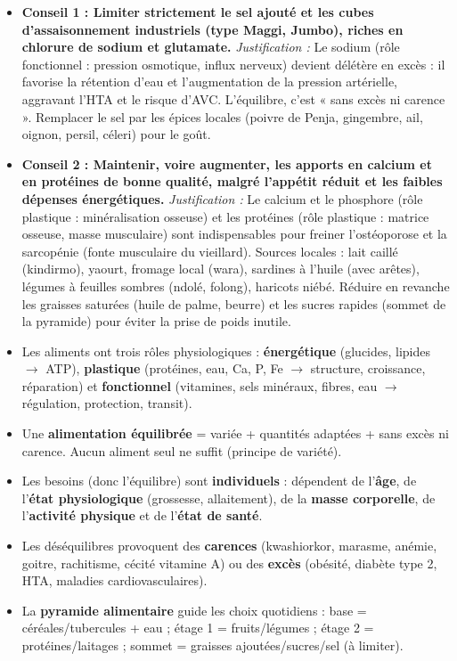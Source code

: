 \documentclass[11pt]{article}
\begin{document}
\begin{corrige}
\begin{itemize}
  \item \textbf{Conseil 1 : Limiter strictement le sel ajouté et les cubes d'assaisonnement industriels (type Maggi, Jumbo), riches en chlorure de sodium et glutamate.}
  \textit{Justification :} Le sodium (rôle fonctionnel : pression osmotique, influx nerveux) devient délétère en excès : il favorise la rétention d'eau et l'augmentation de la pression artérielle, aggravant l'HTA et le risque d'AVC. L'équilibre, c'est « sans excès ni carence ». Remplacer le sel par les épices locales (poivre de Penja, gingembre, ail, oignon, persil, céleri) pour le goût.
  \item \textbf{Conseil 2 : Maintenir, voire augmenter, les apports en calcium et en protéines de bonne qualité, malgré l'appétit réduit et les faibles dépenses énergétiques.}
  \textit{Justification :} Le calcium et le phosphore (rôle plastique : minéralisation osseuse) et les protéines (rôle plastique : matrice osseuse, masse musculaire) sont indispensables pour freiner l'ostéoporose et la sarcopénie (fonte musculaire du vieillard). Sources locales : lait caillé (kindirmo), yaourt, fromage local (wara), sardines à l'huile (avec arêtes), légumes à feuilles sombres (ndolé, folong), haricots niébé. Réduire en revanche les graisses saturées (huile de palme, beurre) et les sucres rapides (sommet de la pyramide) pour éviter la prise de poids inutile.
\end{itemize}
\end{corrige}

\begin{aretenir}
\begin{itemize}
  \item Les aliments ont trois rôles physiologiques : \textbf{énergétique} (glucides, lipides $\rightarrow$ ATP), \textbf{plastique} (protéines, eau, Ca, P, Fe $\rightarrow$ structure, croissance, réparation) et \textbf{fonctionnel} (vitamines, sels minéraux, fibres, eau $\rightarrow$ régulation, protection, transit).
  \item Une \textbf{alimentation équilibrée} = variée + quantités adaptées + sans excès ni carence. Aucun aliment seul ne suffit (principe de variété).
  \item Les besoins (donc l'équilibre) sont \textbf{individuels} : dépendent de l'\textbf{âge}, de l'\textbf{état physiologique} (grossesse, allaitement), de la \textbf{masse corporelle}, de l'\textbf{activité physique} et de l'\textbf{état de santé}.
  \item Les déséquilibres provoquent des \textbf{carences} (kwashiorkor, marasme, anémie, goitre, rachitisme, cécité vitamine A) ou des \textbf{excès} (obésité, diabète type 2, HTA, maladies cardiovasculaires).
  \item La \textbf{pyramide alimentaire} guide les choix quotidiens : base = céréales/tubercules + eau ; étage 1 = fruits/légumes ; étage 2 = protéines/laitages ; sommet = graisses ajoutées/sucres/sel (à limiter).
\end{itemize}
\end{aretenir}
\end{document}
